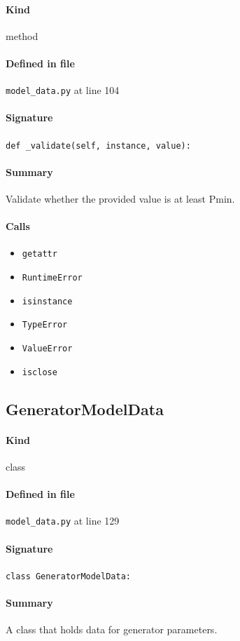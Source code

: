 \documentclass[11pt]{report}
\begin{document}
\paragraph{Kind} method
\paragraph{Defined in file} \texttt{model\_data.py} at line 104
\paragraph{Signature} \texttt{def \_validate(self, instance, value):}
\paragraph{Summary} Validate whether the provided value is at least Pmin.
\paragraph{Calls}
\begin{itemize}[leftmargin=*]
  \item \texttt{getattr}
  \item \texttt{RuntimeError}
  \item \texttt{isinstance}
  \item \texttt{TypeError}
  \item \texttt{ValueError}
  \item \texttt{isclose}
\end{itemize}
\subsection{GeneratorModelData}
\label{def:model_data.py:GeneratorModelData:L129}
\paragraph{Kind} class
\paragraph{Defined in file} \texttt{model\_data.py} at line 129
\paragraph{Signature} \texttt{class GeneratorModelData:}
\paragraph{Summary} A class that holds data for generator parameters.
\end{document}
